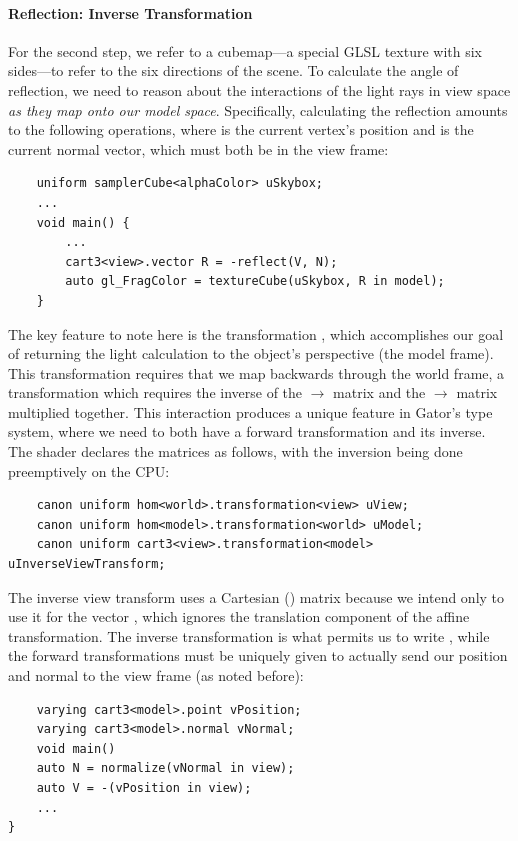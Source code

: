 \documentclass[../main.tex]{subfiles}
\begin{document}
{\paragraph{Reflection: Inverse Transformation}
For the second step, we refer to a cubemap---a special GLSL texture with six sides---to refer to the six directions of the scene.  
To calculate the angle of reflection, we need to reason about the interactions of the light rays in view space \emph{as they map onto our model space}.  
Specifically, calculating the reflection amounts to the following operations, where  is the current vertex's position and  is the current normal vector, which must both be in the view frame:
%
\begin{lstlisting}
	uniform samplerCube<alphaColor> uSkybox;
	...
	void main() {
		...
		cart3<view>.vector R = -reflect(V, N);
		auto gl_FragColor = textureCube(uSkybox, R in model);
	}
\end{lstlisting}
%
The key feature to note here is the transformation , which accomplishes our goal of returning the light calculation to the object's perspective (the model frame).
This transformation requires that we map backwards through the world frame, a transformation which requires the inverse of the $\rightarrow$ matrix and the $\rightarrow$ matrix multiplied together.
This interaction produces a unique feature in Gator's type system, where we need to both have a forward transformation and its inverse.
The shader declares the matrices as follows, with the inversion being done preemptively on the CPU:
%
\begin{lstlisting}
	canon uniform hom<world>.transformation<view> uView;
	canon uniform hom<model>.transformation<world> uModel;
	canon uniform cart3<view>.transformation<model> uInverseViewTransform;
\end{lstlisting}
%
The inverse view transform uses a Cartesian () matrix because
we intend only to use it for the vector , which ignores the translation component of the affine transformation.  The inverse transformation is what permits us to write , while the forward transformations must be uniquely given to actually send our position and normal to the view frame (as noted before):
%
\begin{lstlisting}
	varying cart3<model>.point vPosition;
	varying cart3<model>.normal vNormal;
	void main()
	auto N = normalize(vNormal in view);
	auto V = -(vPosition in view);
	...
}
\end{lstlisting}
%
}
\end{document}

